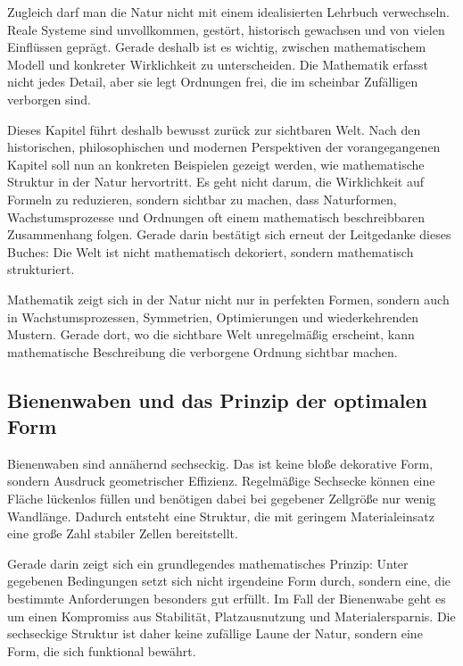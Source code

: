Zugleich darf man die Natur nicht mit einem idealisierten Lehrbuch verwechseln.
Reale Systeme sind unvollkommen,
gestört,
historisch gewachsen
und von vielen Einflüssen geprägt.
Gerade deshalb ist es wichtig,
zwischen mathematischem Modell und konkreter Wirklichkeit zu unterscheiden.
Die Mathematik erfasst nicht jedes Detail,
aber sie legt Ordnungen frei,
die im scheinbar Zufälligen verborgen sind.

Dieses Kapitel führt deshalb bewusst zurück zur sichtbaren Welt.
Nach den historischen,
philosophischen
und modernen Perspektiven der vorangegangenen Kapitel
soll nun an konkreten Beispielen gezeigt werden,
wie mathematische Struktur in der Natur hervortritt.
Es geht nicht darum,
die Wirklichkeit auf Formeln zu reduzieren,
sondern sichtbar zu machen,
dass Naturformen,
Wachstumsprozesse
und Ordnungen oft einem mathematisch beschreibbaren Zusammenhang folgen.
Gerade darin bestätigt sich erneut der Leitgedanke dieses Buches:
Die Welt ist nicht mathematisch dekoriert,
sondern mathematisch strukturiert.

\begin{DidacticBox}
	\label{box:natur-struktur}
	Mathematik zeigt sich in der Natur nicht nur in perfekten Formen,
	sondern auch in Wachstumsprozessen,
	Symmetrien,
	Optimierungen
	und wiederkehrenden Mustern.
	Gerade dort,
	wo die sichtbare Welt unregelmäßig erscheint,
	kann mathematische Beschreibung die verborgene Ordnung sichtbar machen.
\end{DidacticBox}


\subsection{Bienenwaben und das Prinzip der optimalen Form}

Bienenwaben sind annähernd sechseckig.
Das ist keine bloße dekorative Form,
sondern Ausdruck geometrischer Effizienz.
Regelmäßige Sechsecke können eine Fläche lückenlos füllen
und benötigen dabei bei gegebener Zellgröße nur wenig Wandlänge.
Dadurch entsteht eine Struktur,
die mit geringem Materialeinsatz eine große Zahl stabiler Zellen bereitstellt.

Gerade darin zeigt sich ein grundlegendes mathematisches Prinzip:
Unter gegebenen Bedingungen setzt sich nicht irgendeine Form durch,
sondern eine,
die bestimmte Anforderungen besonders gut erfüllt.
Im Fall der Bienenwabe geht es um einen Kompromiss aus Stabilität,
Platzausnutzung
und Materialersparnis.
Die sechseckige Struktur ist daher keine zufällige Laune der Natur,
sondern eine Form,
die sich funktional bewährt.


